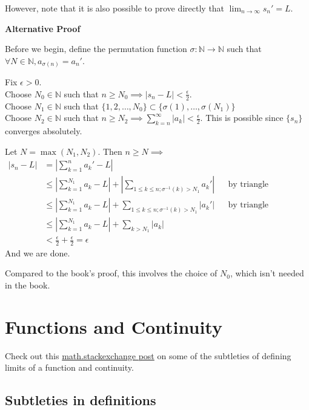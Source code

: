 \documentclass{article}
\begin{document}
However, note that it is also possible to prove directly that $\lim_{n\rightarrow \infty} s_n' = L$.

\textbf{Alternative Proof}

Before we begin, define the permutation function $\sigma: \mathbb{N}\rightarrow \mathbb{N}$ such that $\forall N\in \mathbb{N}, a_{\sigma(n)}=a_n'$.

Fix $\epsilon > 0$. \\
Choose $N_0\in \mathbb{N}$ such that $n\geq N_0\implies |s_n - L| < \frac{\epsilon}{2}$.\\
Choose $N_1\in \mathbb{N}$ such that $\{1, 2, \dots, N_0\}\subset \{\sigma(1),\dots, \sigma(N_1)\}$\\
Choose $N_2\in \mathbb{N}$ such that $n\geq N_2\implies \sum_{k=n}^\infty |a_k|<\frac{\epsilon}{2}$. This is possible since $\{s_n\}$ converges absolutely.

Let $N=\max(N_1, N_2)$. Then $n\geq N\implies$
\begin{align*}
	|s_n - L| &= |\sum_{k=1}^n a_k' - L|\\
	&\leq |\sum_{k=1}^{N_1} a_k - L| + |\sum_{1\leq k\leq n; \sigma^{-1}(k) > N_1}a_k'| &&\text{by triangle inequality} \\
	&\leq |\sum_{k=1}^{N_1} a_k - L| + \sum_{1\leq k\leq n; \sigma^{-1}(k) > N_1}|a_k'| &&\text{by triangle inequality} \\
	&\leq |\sum_{k=1}^{N_1} a_k - L| + \sum_{k > N_1}|a_k|\\
	&< \frac{\epsilon}{2} + \frac{\epsilon}{2} = \epsilon
\end{align*}
And we are done.

Compared to the book's proof, this involves the choice of $N_0$, which isn't needed in the book.


\section{Functions and Continuity}
Check out this \href{https://math.stackexchange.com/questions/455296/can-a-function-with-just-one-point-in-its-domain-be-continuous}{math.stackexchange post} on some of the subtleties of defining limits of a function and continuity. 


\subsection{Subtleties in definitions}
\end{document}
